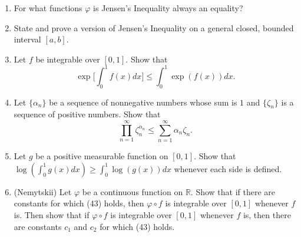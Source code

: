 \begin{enumerate}
    \item For what functions $\varphi$ is Jensen's Inequality always an equality?
    \item State and prove a version of Jensen's Inequality on a general closed, bounded interval $[a,b]$.
    \item Let $f$ be integrable over $[0,1]$. Show that 
    \[
    \exp\biggl [\int_0^1f(x)dx\biggr ] \le \int_0^1 \exp(f(x))dx.   
    \]
    \item Let $\{\alpha_n\}$ be a sequence of nonnegative numbers whose sum is $1$ and $\{\zeta_n\}$ is a sequence of positive numbers. Show that
    \[
    \prod_{n=1}^\infty \zeta_n^{\alpha_n} \le \sum_{n=1}^\infty \alpha_n \zeta_n. 
    \]
    \item Let $g$ be a positive measurable function on $[0,1]$. Show that $\log(\int_0^1g(x)dx) \ge\int_0^1\log(g(x))dx$ whenever each side is defined.
    \item (Nemytskii) Let $\varphi$ be a continuous function on $\mathbb{R}$.
    Show that if there are constants for which (43) holds, then $\varphi\circ f$ is integrable over $[0,1]$ whenever $f$ is.
    Then show that if $\varphi\circ f$ is integrable over $[0,1]$ whenever $f$ is, then there are constants $c_1$ and $c_2$ for which (43) holds.
\end{enumerate}